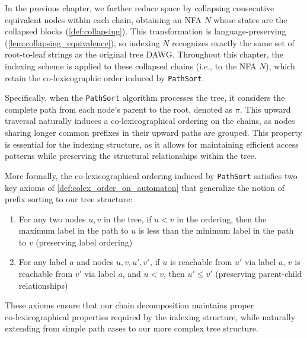 In the previous chapter, we further reduce space by collapsing consecutive equivalent nodes within each chain, obtaining an NFA $N$ whose states are the collapsed blocks (\cref{def:collapsing}). This transformation is language-preserving (\cref{lem:collapsing_equivalence}), so indexing $N$ recognizes exactly the same set of root-to-leaf strings as the original tree DAWG. Throughout this chapter, the indexing scheme is applied to these collapsed chains (i.e., to the NFA $N$), which retain the co-lexicographic order induced by \texttt{PathSort}.

Specifically, when the \texttt{PathSort} algorithm processes the tree, it considers the complete path from each node's parent to the root, denoted as $\pi$. This upward traversal naturally induces a co-lexicographical ordering on the chains, as nodes sharing longer common prefixes in their upward paths are grouped. This property is essential for the indexing structure, as it allows for maintaining efficient access patterns while preserving the structural relationships within the tree.

More formally, the co-lexicographical ordering induced by \texttt{PathSort} satisfies two key axioms of \cref{def:colex_order_on_automaton} that generalize the notion of prefix sorting to our tree structure:

\begin{enumerate}
    \item For any two nodes $u,v$ in the tree, if $u < v$ in the ordering, then the maximum label in the path to $u$ is less than the minimum label in the path to $v$ (preserving label ordering)
    \item For any label $a$ and nodes $u,v,u',v'$, if $u$ is reachable from $u'$ via label $a$, $v$ is reachable from $v'$ via label $a$, and $u < v$, then $u' \leq v'$ (preserving parent-child relationships)
\end{enumerate}

These axioms ensure that our chain decomposition maintains proper\\ co-lexicographical properties required by the indexing structure, while naturally extending from simple path cases to our more complex tree structure.

